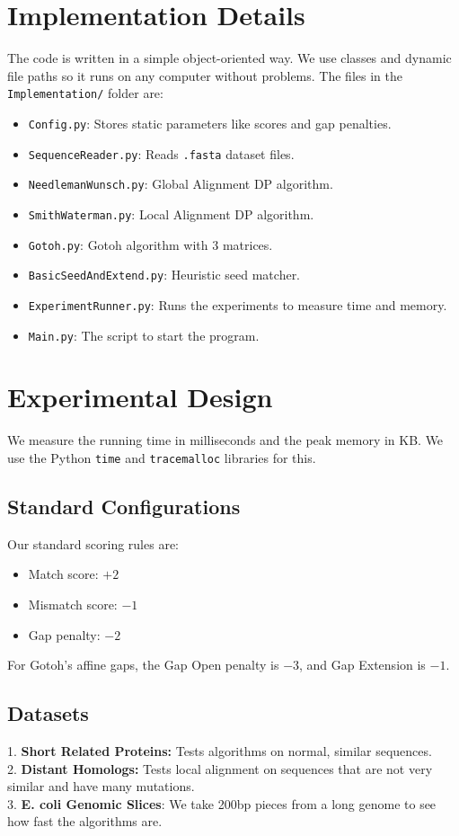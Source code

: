 \documentclass[Assignment,MME,english]{twbook}
\begin{document}
\chapter{Implementation Details}
The code is written in a simple object-oriented way. We use classes and dynamic file paths so it runs on any computer without problems.
The files in the \texttt{Implementation/} folder are:
\begin{itemize}
    \item \texttt{Config.py}: Stores static parameters like scores and gap penalties.
    \item \texttt{SequenceReader.py}: Reads \texttt{.fasta} dataset files.
    \item \texttt{NeedlemanWunsch.py}: Global Alignment DP algorithm.
    \item \texttt{SmithWaterman.py}: Local Alignment DP algorithm.
    \item \texttt{Gotoh.py}: Gotoh algorithm with 3 matrices.
    \item \texttt{BasicSeedAndExtend.py}: Heuristic seed matcher.
    \item \texttt{ExperimentRunner.py}: Runs the experiments to measure time and memory.
    \item \texttt{Main.py}: The script to start the program.
\end{itemize}

\chapter{Experimental Design}
We measure the running time in milliseconds and the peak memory in KB. We use the Python \texttt{time} and \texttt{tracemalloc} libraries for this.

\section{Standard Configurations}
Our standard scoring rules are:
\begin{itemize}
    \item Match score: $+2$
    \item Mismatch score: $-1$
    \item Gap penalty: $-2$
\end{itemize}
For Gotoh's affine gaps, the Gap Open penalty is $-3$, and Gap Extension is $-1$.

\section{Datasets}
1. \textbf{Short Related Proteins:} Tests algorithms on normal, similar sequences. \\
2. \textbf{Distant Homologs:} Tests local alignment on sequences that are not very similar and have many mutations.\\
3. \textbf{E. coli Genomic Slices}: We take 200bp pieces from a long genome to see how fast the algorithms are.
\end{document}
